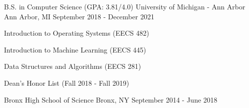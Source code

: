 

\begin{cventries}


  \cventry
    {B.S. in Computer Science (GPA: 3.81/4.0)}
    {University of Michigan - Ann Arbor}
    {Ann Arbor, MI}
    {September 2018 - December 2021}
    {
      \begin{cvitems}
        \item {Introduction to Operating Systems (EECS 482)}
        \item {Introduction to Machine Learning (EECS 445)}
        \item {Data Structures and Algorithms (EECS 281)}
        \item {Dean's Honor List (Fall 2018 - Fall 2019)}
      \end{cvitems}
    }

  \cventry
    {}
    {Bronx High School of Science}
    {Bronx, NY}
    {September 2014 - June 2018}
    {}

\end{cventries}
